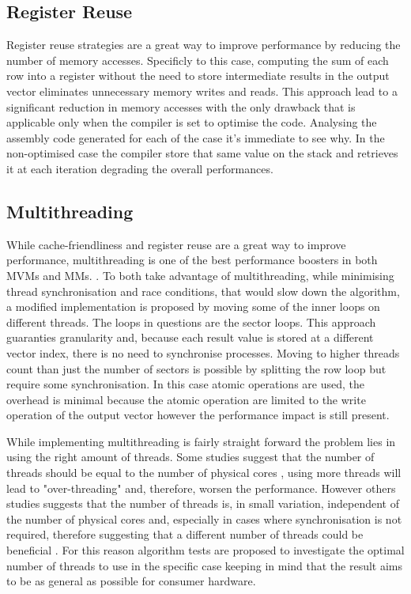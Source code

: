 \subsection{Register Reuse}\label{sec:reg_reuse}
Register reuse strategies are a great way to improve performance by reducing the number of memory accesses.
Specificly to this case, computing the sum of each row into a register without the need to store intermediate results in the output vector eliminates unnecessary memory writes and reads.
This approach lead to a significant reduction in memory accesses with the only drawback that is applicable only when the compiler is set to optimise the code.
Analysing the assembly code generated for each of the case it's immediate to see why.
In the non-optimised case the compiler store that same value on the stack and retrieves it at each iteration degrading the overall performances.\\

\subsection{Multithreading}\label{sec:multithread}
While cache-friendliness and register reuse are a great way to improve performance, multithreading is one of the best performance boosters in both MVMs and MMs.
\cite{yajnaseni_survey_2015,wyrzykowski_mathematical_2016,tang_multithreaded_2024,sulatycke_caching-efficient_1998}.
To both take advantage of multithreading, while minimising thread synchronisation and race conditions, that would slow down the algorithm, a modified implementation is proposed by moving some of the inner loops on different threads.
The loops in questions are the sector loops.
This approach guaranties granularity and, because each result value is stored at a different vector index,
there is no need to synchronise processes.
Moving to higher threads count than just the number of sectors is possible by splitting the row loop but require some synchronisation.
In this case atomic operations are used, the overhead is minimal because the atomic operation are limited to the write operation of the output vector however the performance impact is still present.

While implementing multithreading is fairly straight forward the problem lies in using the right amount of threads.
Some studies suggest that the number of threads should be equal to the number of physical cores \cite{bhutani_exploring_2024},
 using more threads will lead to "over-threading" and, therefore, worsen the performance.
However others studies suggests that the number of threads is, in small variation, independent of the number of physical cores and,
 especially in cases where synchronisation is not required, therefore suggesting that a different number of threads could be beneficial  \cite{cooper_how_2011}.
For this reason algorithm tests are proposed to investigate the optimal number of threads to use in the specific case
keeping in mind that the result aims to be as general as possible for consumer hardware.

